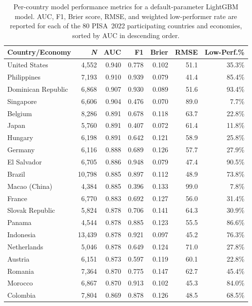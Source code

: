 \begin{table}[!t]
\centering
\scriptsize
\renewcommand{\arraystretch}{0.6}
\caption{Per-country model performance metrics for a default-parameter LightGBM model. AUC, F1, Brier score, RMSE, and weighted low-performer rate are reported for each of the 80 PISA~2022 participating countries and economies, sorted by AUC in descending order.\label{tab:per-country}}
\begin{tabular}{@{}lrrrrrr@{}}
\toprule
\textbf{Country/Economy} & \textbf{\textit{N}} & \textbf{AUC} & \textbf{F1} & \textbf{Brier} & \textbf{RMSE} & \textbf{Low-Perf.\%} \\
\midrule
United States & 4,552 & 0.940 & 0.778 & 0.102 & 51.1 & 35.3\% \\
Philippines & 7,193 & 0.910 & 0.939 & 0.079 & 41.4 & 85.4\% \\
Dominican Republic & 6,868 & 0.907 & 0.930 & 0.089 & 51.6 & 93.4\% \\
Singapore & 6,606 & 0.904 & 0.476 & 0.070 & 89.0 & 7.7\% \\
Belgium & 8,286 & 0.891 & 0.678 & 0.118 & 63.7 & 22.8\% \\
Japan & 5,760 & 0.891 & 0.407 & 0.072 & 61.4 & 11.8\% \\
Hungary & 6,198 & 0.891 & 0.642 & 0.121 & 58.9 & 25.8\% \\
Germany & 6,116 & 0.888 & 0.689 & 0.126 & 57.7 & 27.9\% \\
El Salvador & 6,705 & 0.886 & 0.948 & 0.079 & 47.4 & 90.5\% \\
Brazil & 10,798 & 0.885 & 0.897 & 0.112 & 48.9 & 73.8\% \\
Macao (China) & 4,384 & 0.885 & 0.396 & 0.133 & 99.0 & 7.8\% \\
France & 6,770 & 0.883 & 0.692 & 0.127 & 56.0 & 31.4\% \\
Slovak Republic & 5,824 & 0.878 & 0.706 & 0.141 & 64.3 & 30.9\% \\
Panama & 4,544 & 0.878 & 0.885 & 0.123 & 55.5 & 86.6\% \\
Indonesia & 13,439 & 0.878 & 0.921 & 0.097 & 45.2 & 76.3\% \\
Netherlands & 5,046 & 0.878 & 0.649 & 0.124 & 71.0 & 27.8\% \\
Austria & 6,151 & 0.873 & 0.597 & 0.119 & 60.1 & 22.8\% \\
Romania & 7,364 & 0.870 & 0.775 & 0.147 & 62.7 & 45.4\% \\
Morocco & 6,867 & 0.870 & 0.913 & 0.102 & 45.3 & 84.0\% \\
Colombia & 7,804 & 0.869 & 0.878 & 0.126 & 48.5 & 68.5\% \\

\end{tabular}
\end{table}
